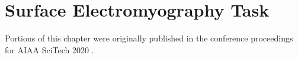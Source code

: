\chapter{Surface Electromyography Task}
\label{chap:emg}

Portions of this chapter were originally published in the conference proceedings for AIAA SciTech 2020 \citep{doi:10.2514/6.2020-1110}.





% 


